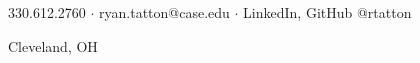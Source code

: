 \Huge{\centerline{}}
\large{\centerline{330.612.2760 $\cdot$ ryan.tatton@case.edu $\cdot$ LinkedIn, GitHub @rtatton}}
\large{\centerline{Cleveland, OH}}